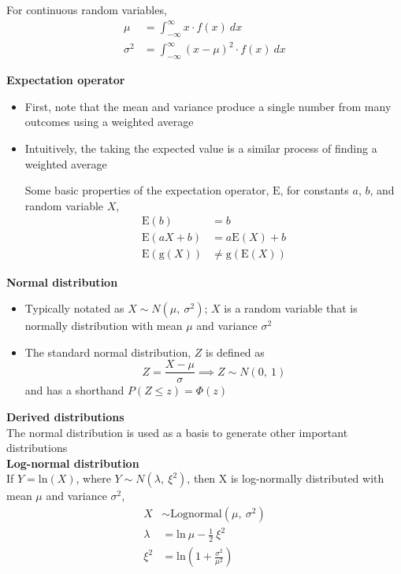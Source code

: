 \documentclass[a4paper]{article}
\newcommand{\heading}[1]{{\small\textbf{#1}}}
\newcommand{\subheading}[1]{{\scriptsize\textbf{#1}}}
\begin{document}
\begin{multicols*}{4}
\begin{itemize}
        For continuous random variables,
        \begin{align*}
            \mu &= \int^\infty_{-\infty} x \cdot f(x)\ dx \\
            \sigma^2 &= \int^\infty_{-\infty} (x - \mu)^2 \cdot f(x)\ dx
        \end{align*}
\end{itemize}

\heading{Expectation operator}
\begin{itemize} \itemsep -0.5em
    \item First, note that the mean and variance produce a single number
        from many outcomes using a weighted average
    \item Intuitively, the taking the expected value is a similar
        process of finding a weighted average
    
        Some basic properties of the expectation operator, $\mathrm{E}$,
        for constants $a$, $b$, and random variable $X$,
        \begin{align*}
            \mathrm{E}(b) &= b\\
            \mathrm{E}(aX + b) &= a\mathrm{E}(X) + b\\
            \mathrm{E}(\mathrm{g}(X)) &\neq \mathrm{g}(\mathrm{E}(X))
        \end{align*}
\end{itemize}

\heading{Normal distribution}
\begin{itemize} \itemsep -0.5em
    \item Typically notated as $X\sim N(\mu,\ \sigma^2)$; $X$ is a random
        variable that is normally distribution with mean $\mu$ and
        variance $\sigma^2$
    \item The standard normal distribution, $Z$ is defined as
        $$ Z = \frac{X - \mu}{\sigma} \implies Z\sim N(0,\ 1) $$
        and has a shorthand $P(Z \leq z) = \Phi(z)$
\end{itemize}

\heading{Derived distributions}\\
The normal distribution is used as a basis to generate other important 
distributions\\

\subheading{Log-normal distribution}\\
If $Y = \mathrm{ln}(X)$, where $Y\sim N(\lambda,\ \xi^2)$, then X is
log-normally distributed with mean $\mu$ and variance $\sigma^2$,
\begin{align*}
    X       &\sim \text{Lognormal}(\mu,\ \sigma^2)\\
    \lambda &= \mathrm{ln}\ \mu - \frac{1}{2}\ \xi^2\\
    \xi^2   &= \mathrm{ln}\left ( 1 + \frac{\sigma^2}{\mu^2} \right )
\end{align*}


\end{multicols*}
\end{document}
